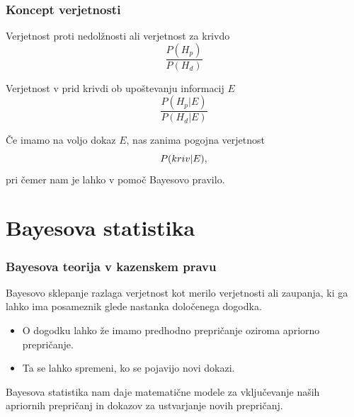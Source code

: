 \documentclass{beamer}
\begin{document}
\begin{frame}
    \frametitle{Koncept verjetnosti}
    \begin{beamerboxesrounded}[]{Verjetnost proti nedolžnosti ali verjetnost za krivdo}
        \[
            \frac{P(H_p)}{P(H_d)}
        \]    
    \end{beamerboxesrounded} \vspace{3mm}
    \begin{beamerboxesrounded}[]{Verjetnost v prid krivdi ob upoštevanju informacij $E$}
        \[
            \frac{P(H_p \lvert E)}{P(H_d \lvert E)} 
        \]    
    \end{beamerboxesrounded} \vspace{5mm}
    Če imamo na voljo dokaz $E$, nas zanima pogojna verjetnost
    \[
        P(kriv \lvert E), \vspace{2mm}
    \]
    pri čemer nam je lahko v pomoč Bayesovo pravilo.
\end{frame}

\section{Bayesova statistika}

\begin{frame}
    \frametitle{Bayesova teorija v kazenskem pravu}
    Bayesovo sklepanje razlaga verjetnost kot merilo verjetnosti ali zaupanja, ki ga lahko ima posameznik glede nastanka določenega dogodka.
    \begin{itemize}
      \item O dogodku lahko že imamo predhodno prepričanje oziroma apriorno prepričanje.
      \item Ta se lahko spremeni, ko se pojavijo novi dokazi.
    \end{itemize} \vspace{3mm}
    Bayesova statistika nam daje matematične modele za vključevanje naših apriornih prepričanj in dokazov za ustvarjanje novih prepričanj.
\end{frame}
\end{document}
